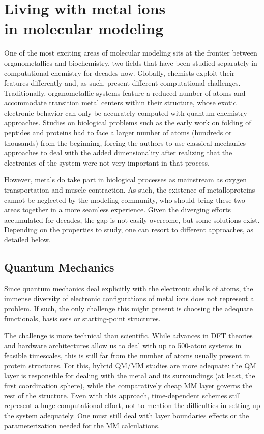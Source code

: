 \chapter[Living with metal ions in molecular modeling]{Living with metal ions \\in molecular modeling}
\label{chap:appendix-c}
One of the most exciting areas of molecular modeling sits at the frontier between organometallics and biochemistry, two fields that have been studied separately in computational chemistry for decades now. Globally, chemists exploit their features differently and, as such, present different computational challenges. Traditionally, organometallic systems feature a reduced number of atoms and accommodate transition metal centers within their structure, whose exotic electronic behavior can only be accurately computed with quantum chemistry approaches. Studies on biological problems such as the early work on folding of peptides and proteins had to face a larger number of atoms (hundreds or thousands) from the beginning, forcing the authors to use classical mechanics approaches to deal with the added dimensionality after realizing that the electronics of the system were not very important in that process.

However, metals do take part in biological processes as mainstream as oxygen transportation and muscle contraction. As such, the existence of metalloproteins cannot be neglected by the modeling community, who should bring these two areas together in a more seamless experience. Given the diverging efforts accumulated for decades, the gap is not easily overcome, but some solutions exist. Depending on the properties to study, one can resort to different approaches, as detailed below.

\section{Quantum Mechanics}
Since quantum mechanics deal explicitly with the electronic shells of atoms, the immense diversity of electronic configurations of metal ions does not represent a problem. If such, the only challenge this might present is choosing the adequate functionals, basis sets or starting-point structures.

The challenge is more technical than scientific. While advances in DFT theories and hardware architectures allow us to deal with up to 500-atom systems in feasible timescales, this is still far from the number of atoms usually present in protein structures. For this, hybrid QM/MM studies are more adequate: the QM layer is responsible for dealing with the metal and its surroundings (at least, the first coordination sphere), while the comparatively cheap MM layer governs the rest of the structure. Even with this approach, time-dependent schemes still represent a huge computational effort, not to mention the difficulties in setting up the system adequately. One must still deal with layer boundaries effects or the parameterization needed for the MM calculations.

